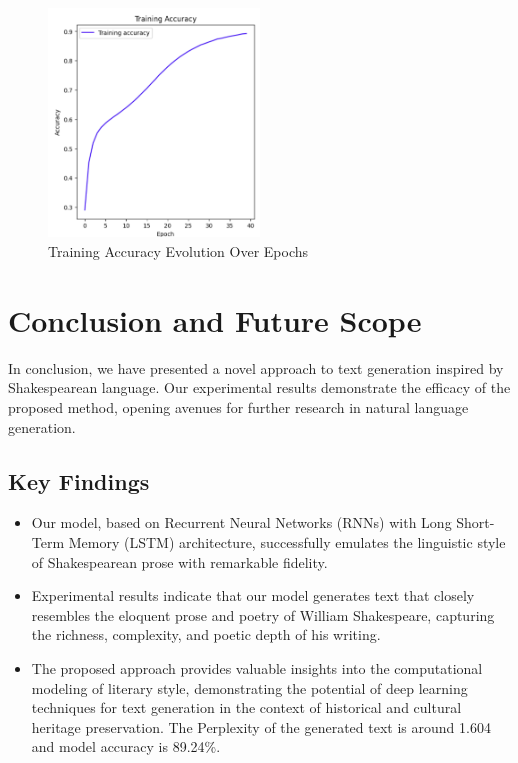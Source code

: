 \documentclass[conference]{IEEEtran}
\begin{document}
\begin{figure}
    \centering
    \includegraphics[width=0.5\textwidth]{l1.png}
    \caption{Training Accuracy Evolution Over Epochs}
    \label{fig:example}
\end{figure}






\section{Conclusion and Future Scope}
In conclusion, we have presented a novel approach to text generation inspired by Shakespearean language. Our experimental results demonstrate the efficacy of the proposed method, opening avenues for further research in natural language generation. 

\subsection{Key Findings}
\begin{itemize}
    \item Our model, based on Recurrent Neural Networks (RNNs) with Long Short-Term Memory (LSTM) architecture, successfully emulates the linguistic style of Shakespearean prose with remarkable fidelity.
    \item Experimental results indicate that our model generates text that closely resembles the eloquent prose and poetry of William Shakespeare, capturing the richness, complexity, and poetic depth of his writing.
    \item The proposed approach provides valuable insights into the computational modeling of literary style, demonstrating the potential of deep learning techniques for text generation in the context of historical and cultural heritage preservation. The Perplexity of the generated text is around 1.604 and model accuracy is 89.24\%.
\end{itemize}
\end{document}
